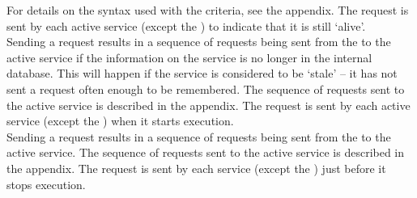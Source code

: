 For details on the syntax used with the criteria, see the 
 appendix.
The  request is sent by each
active service (except the ) to indicate
that it is still `alive'.\\

Sending a  request results in a
sequence of requests being sent from the 
to the active service if the information on the service is no longer in the internal
database.
This will happen if the service is considered to be `stale' -- it has not sent a
 request often enough to be
remembered.
The sequence of requests sent to the active service is described in the 
 appendix.
The  request is sent by each
active service (except the ) when it
starts execution.\\

Sending a  request results in a
sequence of requests being sent from the 
to the active service.
The sequence of requests sent to the active service is described in the 
 appendix.
The  request is sent by each
service (except the ) just before it stops
execution.\\

